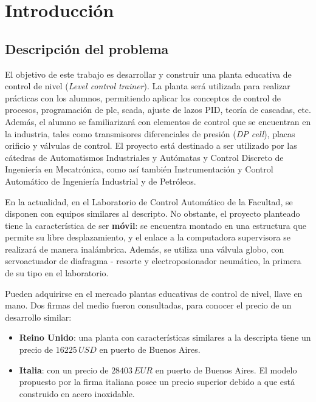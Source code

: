 \chapter{Introducción}
\label{ch:intro}

\section{Descripción del problema}
\label{sec:DescripcionProblema}
El objetivo de este trabajo es desarrollar y construir una planta
educativa de control de nivel
(\textit{Level control trainer}).
La planta será utilizada para realizar prácticas con los
alumnos, permitiendo aplicar los conceptos de
control de procesos, programación de \gls{plc}, \gls{scada},
ajuste de lazos PID, teoría de cascadas, etc.
Además, el alumno se familiarizará con elementos de control que
se encuentran en la industria, tales como transmisores diferenciales de presión
(\textit{DP cell}), placas orificio y válvulas de control.
El proyecto está destinado a ser utilizado por las cátedras de
Automatismos Industriales y Autómatas y Control Discreto de
Ingeniería en Mecatrónica,
como así también Instrumentación y Control Automático de Ingeniería Industrial
y de Petróleos.

En la actualidad, en el Laboratorio de Control Automático de la Facultad, 
se disponen con equipos similares al descripto.
No obstante, el proyecto planteado tiene la característica de ser 
\textbf{móvil}: se encuentra montado en una estructura que 
permite su libre desplazamiento, y el enlace a la
computadora supervisora se realizará de manera inalámbrica.
Además, se utiliza una válvula globo, con servoactuador de diafragma - resorte
y electroposionador neumático, la primera de su tipo en el laboratorio.

Pueden adquirirse en el mercado plantas educativas de control de nivel, llave
en mano.
Dos firmas del medio fueron consultadas, para conocer 
el precio de un desarrollo similar:
\begin{itemize}
 \item \textbf{Reino Unido}: una planta con características similares
 a la descripta tiene un precio de $16225\,USD$ en puerto de Buenos Aires.
 \item \textbf{Italia}: con un precio de $28403\,EUR$ en puerto de Buenos
Aires.
 El modelo propuesto por la firma italiana
 posee un precio superior debido a que está construido en acero inoxidable.
\end{itemize}


